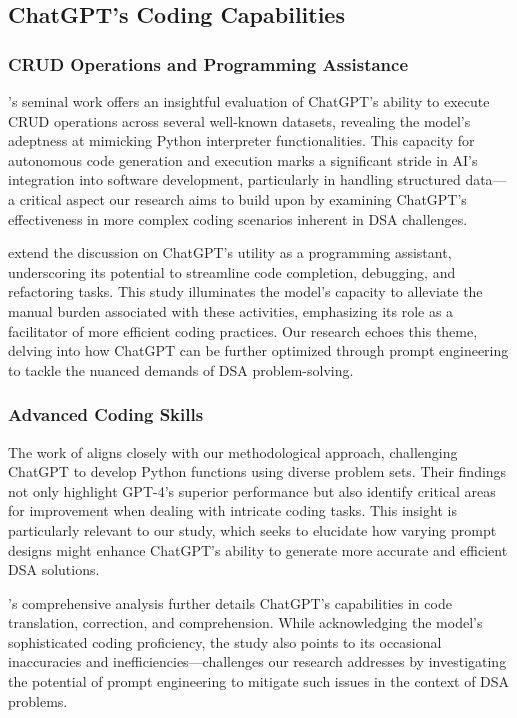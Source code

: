 \subsection{ChatGPT's Coding Capabilities}
\subsubsection{CRUD Operations and Programming Assistance}

\cite{noever2023numeracy}'s seminal work offers an insightful evaluation of ChatGPT's ability to execute CRUD operations across several well-known datasets, revealing the model's adeptness at mimicking Python interpreter functionalities. This capacity for autonomous code generation and execution marks a significant stride in AI's integration into software development, particularly in handling structured data—a critical aspect our research aims to build upon by examining ChatGPT's effectiveness in more complex coding scenarios inherent in DSA challenges.

\cite{Biswas} extend the discussion on ChatGPT's utility as a programming assistant, underscoring its potential to streamline code completion, debugging, and refactoring tasks. This study illuminates the model's capacity to alleviate the manual burden associated with these activities, emphasizing its role as a facilitator of more efficient coding practices. Our research echoes this theme, delving into how ChatGPT can be further optimized through prompt engineering to tackle the nuanced demands of DSA problem-solving.
\subsubsection{Advanced Coding Skills}

The work of \cite{bubeck2023sparks} aligns closely with our methodological approach, challenging ChatGPT to develop Python functions using diverse problem sets. Their findings not only highlight GPT-4's superior performance but also identify critical areas for improvement when dealing with intricate coding tasks. This insight is particularly relevant to our study, which seeks to elucidate how varying prompt designs might enhance ChatGPT's ability to generate more accurate and efficient DSA solutions.

\cite{tian2023chatgpt}'s comprehensive analysis further details ChatGPT's capabilities in code translation, correction, and comprehension. While acknowledging the model's sophisticated coding proficiency, the study also points to its occasional inaccuracies and inefficiencies—challenges our research addresses by investigating the potential of prompt engineering to mitigate such issues in the context of DSA problems.

